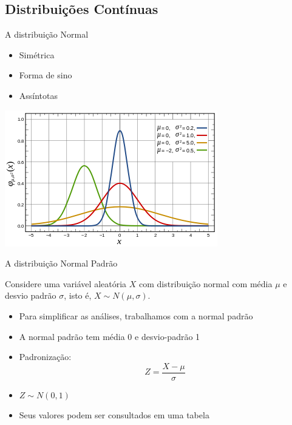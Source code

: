 \documentclass{beamer}
\begin{document}
\subsection{Distribuições Contínuas}

\begin{frame}{A distribuição Normal}
  \begin{itemize}
  \item Simétrica
  \item Forma de sino
  \item Assíntotas
  \end{itemize}

  \begin{center}
    \includegraphics[height=0.6\textheight]{Prob_II/normal}
  \end{center}
\end{frame}

\begin{frame}{A distribuição Normal Padrão}

  Considere uma variável aleatória $X$ com distribuição normal com
  média $\mu$ e desvio padrão $\sigma$, isto é, $X \sim N(\mu,
  \sigma)$.

  \begin{itemize}
  \item Para simplificar as análises, trabalhamos com a normal padrão
  \item A normal padrão tem média 0 e desvio-padrão 1
  \item Padronização:
    \begin{displaymath}
      Z = \frac{X - \mu}{\sigma}
    \end{displaymath}
  \item $Z \sim N(0,1)$
  \item Seus valores podem ser consultados em uma tabela
  \end{itemize}
\end{frame}
\end{document}
